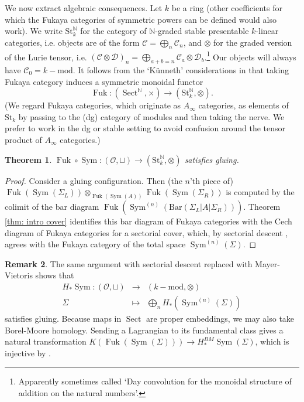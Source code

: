 \documentclass{article}
\def\N{\mathbb{N}}
\DeclareMathOperator{\Sect}{Sect}
\DeclareMathOperator{\Sym}{Sym}
\DeclareMathOperator{\Fuk}{Fuk}
\newtheorem{theorem}{Theorem}[section]
\theoremstyle{definition}
\newtheorem{remark}[theorem]{Remark}
\begin{document}
We now extract algebraic consequences. 
Let $k$ be a ring  (other coefficients for which the Fukaya categories of symmetric powers can be defined would also work).  We write  $\mathrm{St}_k^{\N}$ for the category of $\N$-graded stable presentable $k$-linear categories, i.e. objects are of the form $\mathcal{C} = \bigoplus_{n} \mathcal{C}_n$, and $\otimes$ for the graded version of the Lurie tensor, i.e. $(\mathcal{C} \otimes \mathcal{D})_n = \bigoplus_{a+b = n} \mathcal{C}_a \otimes \mathcal{D}_b$.\footnote{Apparently sometimes called `Day convolution for the  monoidal structure of addition on the natural numbers'.}   Our objects will always have $\mathcal{C}_0 = k-\mathrm{mod}$. 
It follows from the `K\"unneth' considerations in \cite{GPS2} that taking Fukaya category induces a symmetric monoidal functor 
$$\Fuk: (\Sect^{\N}, \times) \to (\mathrm{St}_k^{\N}, \otimes).$$
(We regard Fukaya categories, which originate as $A_\infty$ categories, as elements of $\mathrm{St}_k$ by passing to the (dg) category of modules and then taking the nerve.  We prefer to work in the dg or stable setting to avoid confusion around the tensor product of $A_\infty$ categories.) 



\begin{theorem} \label{thm: gluing}
    $\Fuk \circ \Sym :  (\mathscr{O}, \sqcup) \to (\mathrm{St}_k^{\N}, \otimes)$ satisfies gluing.  
\end{theorem}
\begin{proof}
    Consider a gluing configuration. 
    Then (the $n$'th piece of) $\Fuk(\Sym(\Sigma_L)) \otimes_{\Fuk(\Sym(A))} \Fuk(\Sym(\Sigma_R))$ is computed by the colimit of the bar diagram
    $\Fuk(\Sym^{(n)}(\mathrm{Bar}(\Sigma_L|A| \Sigma_R)))$.  Theorem \ref{thm: intro cover} identifies this bar diagram of Fukaya categories with the Cech diagram of Fukaya categories for a sectorial cover, which, by sectorial descent \cite{GPS2}, agrees with the Fukaya category of the total space $\Sym^{(n)}(\Sigma)$. 
\end{proof}




\begin{remark} \label{rem:homology}
    The same argument with sectorial descent replaced with Mayer-Vietoris shows that 
    \begin{eqnarray*}
        H_* \Sym : (\mathscr{O}, \sqcup) & \to & (k-\mathrm{mod}, \otimes)
        \\
        \Sigma & \mapsto & \bigoplus_n H_*(\Sym^{(n)}(\Sigma))
    \end{eqnarray*} satisfies gluing.  Because maps in $\Sect$ are proper embeddings, we may also take Borel-Moore homology.  
    Sending a Lagrangian to its fundamental class gives a natural transformation 
    $K(\Fuk(\Sym(\Sigma))) \to H_*^{BM}\Sym(\Sigma)$, which is injective by \cite{Lazarev-injective}.  
\end{remark}
\end{document}
